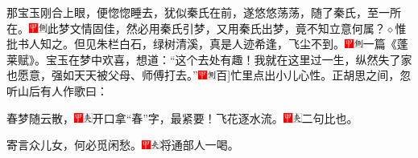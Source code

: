 那宝玉刚合上眼，便惚惚睡去，犹似秦氏在前，遂悠悠荡荡，随了秦氏，至一所在。{\includegraphics[width=3mm]{../Images/00002}\includegraphics[width=3mm]{../Images/00011}\footnotesize \kaishu 此梦文情固佳，然必用秦氏引梦，又用秦氏出梦，竟不知立意何属？{$\diamond$}惟批书人知之。}但见朱栏白石，绿树清溪，真是人迹希逢，飞尘不到。{\includegraphics[width=3mm]{../Images/00002}\includegraphics[width=3mm]{../Images/00011}\footnotesize \kaishu 一篇《蓬莱赋》。}宝玉在梦中欢喜，想道：“这个去处有趣！我就在这里过一生，纵然失了家也愿意，强如天天被父母、师傅打去。”{{\includegraphics[width=3mm]{../Images/00002}\includegraphics[width=3mm]{../Images/00011}\footnotesize \kaishu {(一句)}{[}百{]}忙里点出小儿心性。}}正胡思之间，忽听山后有人作歌曰：

春梦随云散，{\includegraphics[width=3mm]{../Images/00002}\includegraphics[width=3mm]{../Images/00012}\footnotesize \kaishu 开口拿“春”字，最紧要！}飞花逐水流。{\includegraphics[width=3mm]{../Images/00002}\includegraphics[width=3mm]{../Images/00012}\footnotesize \kaishu 二句比也。}

寄言众儿女，何必觅闲愁。{\includegraphics[width=3mm]{../Images/00002}\includegraphics[width=3mm]{../Images/00012}\footnotesize \kaishu 将通部人一喝。}

